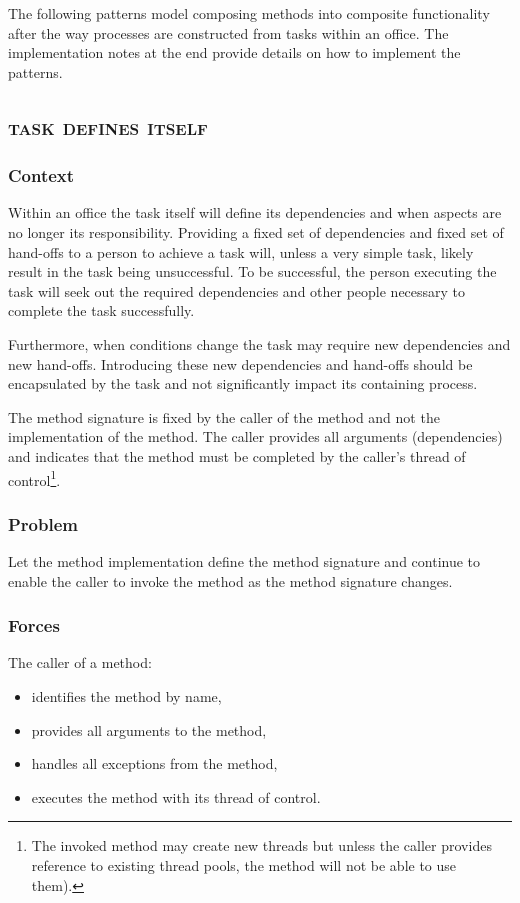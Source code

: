 \documentclass[prodmode]{style/acmlarge}
\begin{document}
The following patterns model composing methods into composite functionality
after the way processes are constructed from tasks within an office.  The
implementation notes at the end provide details on how to implement the
patterns.


\subsection{\textsc{\textbf{task defines itself}}}

\subsubsection*{Context} Within an office the task itself will define its
dependencies and when aspects are no longer its responsibility.  Providing a
fixed set of dependencies and fixed set of hand-offs to a person to achieve a
task will, unless a very simple task, likely result in the task being
unsuccessful.  To be successful, the person executing the task will seek out the
required dependencies and other people necessary to complete the task
successfully.

Furthermore, when conditions change the task may require new dependencies and
new hand-offs.  Introducing these new dependencies and hand-offs should be
encapsulated by the task and not significantly impact its containing process.

The method signature is fixed by the caller of the method and not the
implementation of the method.  The caller provides all arguments (dependencies)
and indicates that the method must be completed by the caller's thread of
control\footnote{The invoked method may create new threads but unless the caller
provides reference to existing thread pools, the method will not be able to use
them).}.

\subsubsection*{Problem} Let the method implementation define the method
signature and continue to enable the caller to invoke the method as the method
signature changes.

\subsubsection*{Forces} The caller of a method:
\begin{itemize}
  \item identifies the method by name,
  \item provides all arguments to the method,
  \item handles all exceptions from the method,
  \item executes the method with its thread of control.
\end{itemize}
\end{document}
